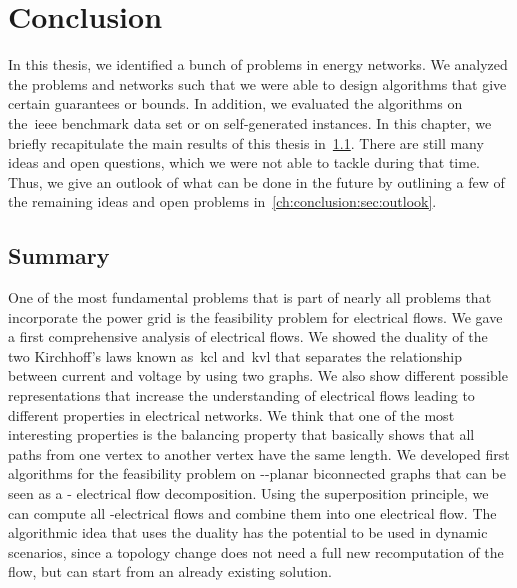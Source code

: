 \chapter[Conclusion]{Conclusion}\label{ch:conclusion}
% 
In this thesis, we identified a bunch of problems in energy networks. We
analyzed the problems and networks such that we were able to design algorithms
that give certain guarantees or bounds. In addition, we evaluated the algorithms
on the~\gls{ieee} benchmark data set or on self-generated instances. In this
chapter, we briefly recapitulate the main results of this thesis
in~\cref{ch:conclusion:sec:summary}. There are still many ideas and open
questions, which we were not able to tackle during that time. Thus, we give an
outlook of what can be done in the future by outlining a few of the remaining
ideas and open problems in~\cref{ch:conclusion:sec:outlook}.
% 
\section{Summary}\label{ch:conclusion:sec:summary}
%
One of the most fundamental problems that is part of nearly all problems that
incorporate the power grid is the feasibility problem for electrical flows. We
gave a first comprehensive analysis of electrical flows. We showed the duality
of the two Kirchhoff's laws known as~\acrlong{kcl} and~\acrlong{kvl} that
separates the relationship between current and voltage by using two graphs. We
also show different possible representations that increase the understanding of
electrical flows leading to different properties in electrical networks. We
think that one of the most interesting properties is the balancing property that
basically shows that all paths from one vertex to another vertex have the same
length.
% 
We developed first algorithms for the feasibility problem on
\source-\sink-planar biconnected graphs that can be seen as a \source-\sink
electrical flow decomposition. Using the superposition principle, we can compute
all \source-\sink electrical flows and combine them into one electrical flow.
The algorithmic idea that uses the duality has the potential to be used in
dynamic scenarios, since a topology change does not need a full new
recomputation of the flow, but can start from an already existing solution.

